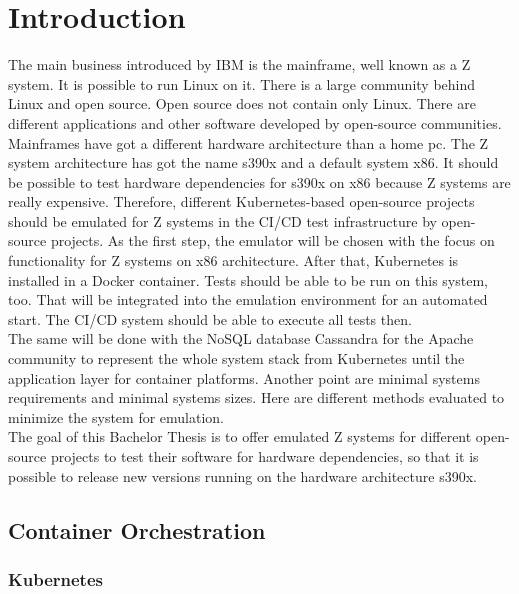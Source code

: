 \chapter{Introduction}\label{ch:intro}

The main business introduced by IBM is the mainframe, well known as a Z system. It is possible to run Linux on it. There is a large community behind Linux and open source. Open source does not contain only Linux. There are different applications and other software developed by open-source communities. Mainframes have got a different hardware architecture than a home pc. The Z system architecture has got the name s390x and a default system x86. It should be possible to test hardware dependencies for s390x on x86 because Z systems are really expensive. Therefore, different Kubernetes-based open-source projects should be emulated for Z systems in the CI/CD test infrastructure by open-source projects. As the first step, the emulator will be chosen with the focus on functionality for Z systems on x86 architecture. After that, Kubernetes is installed in a Docker container. Tests should be able to be run on this system, too. That will be integrated into the emulation environment for an automated start. The CI/CD system should be able to execute all tests then. \\
The same will be done with the NoSQL database Cassandra for the Apache community to represent the whole system stack from Kubernetes until the application layer for container platforms. Another point are minimal systems requirements and minimal systems sizes. Here are different methods evaluated to minimize the system for emulation. \\
The goal of this Bachelor Thesis is to offer emulated Z systems for different open-source projects to test their software for hardware dependencies, so that it is possible to release new versions running on the hardware architecture s390x.

\blindtext

\section{Container Orchestration}

\blindtext

\subsection{Kubernetes}

